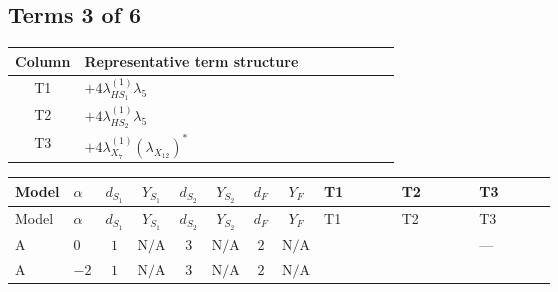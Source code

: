 \documentclass[8pt]{article}
\begin{document}
\begin{landscape}
\subsection*{Terms 3 of 6}
\begin{center}
\begin{tabular}{@{}c >{\raggedright\arraybackslash}p{0.82\linewidth}@{}}
\toprule
Column & Representative term structure \\
\midrule
T1 & \(\displaystyle +4 {\lambda_{HS_1}^{(1)}} {\lambda_5}\) \\
\midrule
T2 & \(\displaystyle +4 {\lambda_{HS_2}^{(1)}} {\lambda_5}\) \\
\midrule
T3 & \(\displaystyle +4 {\lambda_{X_{7}}^{(1)}} \left({\lambda_{X_{12}}}\right)^{*}\) \\
\midrule
\bottomrule
\end{tabular}
\end{center}
\smallskip
\tiny
\begin{longtable}{@{}llcccccc >{\raggedright\arraybackslash}p{0.21\linewidth} >{\raggedright\arraybackslash}p{0.21\linewidth} >{\raggedright\arraybackslash}p{0.21\linewidth}@{}}
\toprule
Model & $\alpha$ & $d_{S_1}$ & $Y_{S_1}$ & $d_{S_2}$ & $Y_{S_2}$ & $d_F$ & $Y_F$ & T1 & T2 & T3 \\
\midrule
\endfirsthead
\toprule
Model & $\alpha$ & $d_{S_1}$ & $Y_{S_1}$ & $d_{S_2}$ & $Y_{S_2}$ & $d_F$ & $Y_F$ & T1 & T2 & T3 \\
\midrule
\endhead
A & $0$ & $1$ & $\text{N/A}$ & $3$ & $\text{N/A}$ & $2$ & $\text{N/A}$ & \scriptsize\adjustbox{max width=\linewidth}{$\begin{gathered} +4 {\lambda_{HS_1}^{(1)}} {\lambda_5}\end{gathered}$} & \scriptsize\adjustbox{max width=\linewidth}{$\begin{gathered} +4 {\lambda_{HS_2}^{(1)}} {\lambda_5}\end{gathered}$} & --- \\
\midrule
A & $-2$ & $1$ & $\text{N/A}$ & $3$ & $\text{N/A}$ & $2$ & $\text{N/A}$ & \scriptsize\adjustbox{max width=\linewidth}{$\begin{gathered} +4 {\lambda_{HS_1}^{(1)}} {\lambda_5}\end{gathered}$} & \scriptsize\adjustbox{max width=\linewidth}{$\begin{gathered} +4 {\lambda_{HS_2}^{(1)}} {\lambda_5}\end{gathered}$} & \scriptsize\adjustbox{max width=\linewidth}{$\begin{gathered} +4 {\lambda_{X_{7}}^{(1)}} \left({\lambda_{X_{12}}}\right)^{*}\end{gathered}$} \\

\end{longtable}
\end{landscape}
\end{document}
